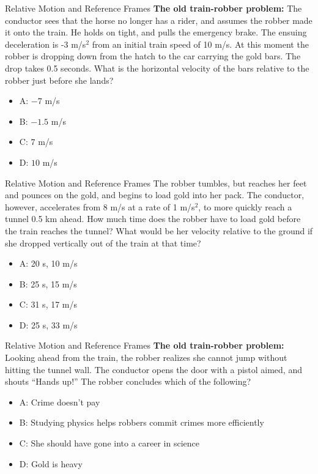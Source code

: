 \documentclass{beamer}
\begin{document}
\begin{frame}{Relative Motion and Reference Frames}
\small 
\textbf{The old train-robber problem:} The conductor sees that the horse no longer has a rider, and assumes the robber made it onto the train.  He holds on tight, and pulls the emergency brake.  The ensuing deceleration is -3 m/s$^2$ from an initial train speed of 10 m/s.  At this moment the robber is dropping down from the hatch to the car carrying the gold bars.  The drop takes 0.5 seconds.  What is the horizontal velocity of the bars relative to the robber just before she lands?\\
\begin{itemize}
\item A: $-7$ m/s
\item B: $-1.5$ m/s
\item C: $7$  m/s
\item D: $10$  m/s
\end{itemize}
\end{frame}

\begin{frame}{Relative Motion and Reference Frames}
\small 
The robber tumbles, but reaches her feet and pounces on the gold, and begins to load gold into her pack.  The conductor, however, accelerates from 8 m/s at a rate of 1 m/s$^2$, to more quickly reach a tunnel 0.5 km ahead.  How much time does the robber have to load gold before the train reaches the tunnel?  What would be her velocity relative to the ground if she dropped vertically out of the train at that time? \\
\begin{itemize}
\item A: 20 s, 10 m/s
\item B: 25 s, 15 m/s
\item C: 31 s, 17 m/s
\item D: 25 s, 33 m/s
\end{itemize}
\end{frame}

\begin{frame}{Relative Motion and Reference Frames}
\small 
\textbf{The old train-robber problem:} Looking ahead from the train, the robber realizes she cannot jump without hitting the tunnel wall.  The conductor opens the door with a pistol aimed, and shouts ``Hands up!''  The robber concludes which of the following?  \\
\begin{itemize}
\item A: Crime doesn't pay
\item B: Studying physics helps robbers commit crimes more efficiently
\item C: She should have gone into a career in science
\item D: Gold is heavy
\end{itemize}
\end{frame}
\end{document}
